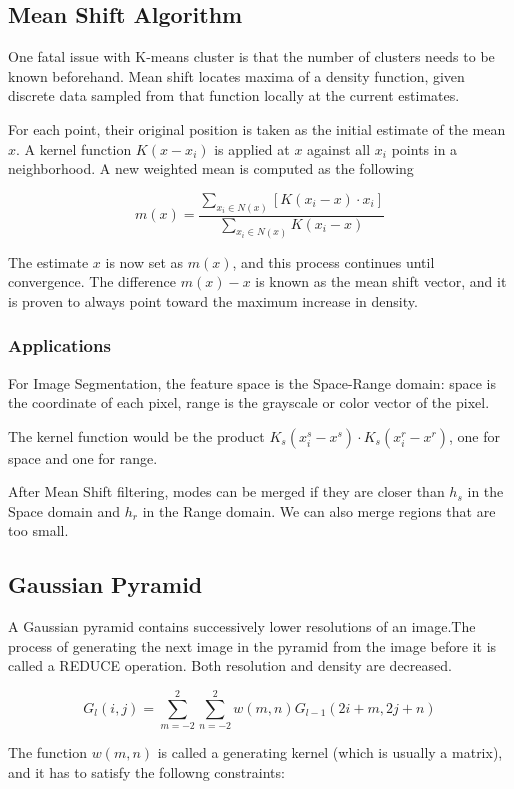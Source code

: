 \documentclass{article}
\begin{document}
\begin{multicols}{3}
\subsection{Mean Shift Algorithm}

One fatal issue with K-means cluster is that the number of clusters needs to be known beforehand. Mean shift locates maxima of a density function, given discrete data sampled from that function locally at the current estimates.

For each point, their original position is taken as the initial estimate of the mean $x$. A kernel function $K(x-x_i)$ is applied at $x$ against all $x_i$ points in a neighborhood. A new weighted mean is computed as the following

$$
m(x) = \frac{\sum _{x_i \in N(x)}[K(x_i-x) \cdot x_i]}{\sum _{x_i \in N(x)}K(x_i-x)}
$$

The estimate $x$ is now set as $m(x)$, and this process continues until convergence. The difference $m(x) - x$ is known as the mean shift vector, and it is proven to always point toward the maximum increase in density.

\subsubsection{Applications}

For Image Segmentation, the feature space is the Space-Range domain: space is the coordinate of each pixel, range is the grayscale or color vector of the pixel.

The kernel function would be the product $K_s(x_i^s - x^s) \cdot K_s(x_i^r - x^r)$, one for space and one for range.

After Mean Shift filtering, modes can be merged if they are closer than $h_s$ in the Space domain and $h_r$ in the Range domain. We can also merge regions that are too small.

\subsection{Gaussian Pyramid}

A Gaussian pyramid contains successively lower resolutions of an image.The process of generating the next image in the pyramid from the image before it is called a REDUCE operation. Both resolution and density are decreased.

$$
G_l(i,j) = \sum_{m = -2}^2 \sum_{n = -2}^2 w(m,n) G_{l-1} (2i+m, 2j+n)
$$

The function $w(m, n)$ is called a generating kernel (which is usually a matrix), and it has to satisfy the followng constraints:


\end{multicols}
\end{document}

